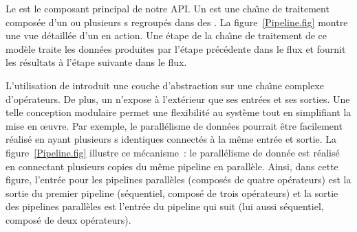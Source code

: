 Le  est le composant principal de notre {API}. Un  est une cha\^{\i}ne de traitement compos\'ee d'un ou plusieurs s regroup\'es dans des . La figure~\ref{Pipeline.fig} montre une vue d\'etaill\'ee d'un  en action. Une \'etape de la cha\^{\i}ne de traitement de ce mod\`ele traite les donn\'ees produites par l'\'etape pr\'ec\'edente dans le flux et fournit les r\'esultats \`a l'étape suivante dans le flux. 

%
%




L'utilisation de  introduit une couche d'abstraction sur une cha\^{\i}ne complexe d'op\'erateurs. De plus, un  n'expose à l'ext\'erieur que ses entr\'ees et ses sorties. Une telle conception modulaire permet une flexibilit\'e au syst\`eme tout en simplifiant la mise en œuvre. Par exemple, le parall\'elisme de donn\'ees
pourrait \^etre facilement r\'ealis\'e en ayant plusieurs s identiques connect\'es \`a la m\^eme entr\'ee et sortie. La figure~\ref{Pipeline.fig} illustre ce m\'ecanisme~: le parall\'elisme de donn\'ee est r\'ealis\'e en connectant plusieurs copies du m\^eme pipeline en parall\`ele. Ainsi, dans cette figure, l'entr\'ee pour les pipelines parall\`eles (compos\'es de quatre op\'erateurs) est la sortie du premier pipeline (s\'equentiel, compos\'e de trois op\'erateurs) et la sortie des pipelines parall\`eles est l'entr\'ee du pipeline qui suit (lui aussi s\'equentiel, compos\'e de deux op\'erateurs).


